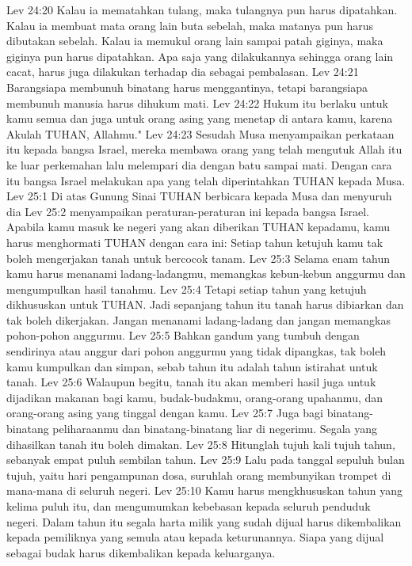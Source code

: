Lev 24:20  Kalau ia mematahkan tulang, maka tulangnya pun harus dipatahkan. Kalau ia membuat mata orang lain buta sebelah, maka matanya pun harus dibutakan sebelah. Kalau ia memukul orang lain sampai patah giginya, maka giginya pun harus dipatahkan. Apa saja yang dilakukannya sehingga orang lain cacat, harus juga dilakukan terhadap dia sebagai pembalasan.
Lev 24:21  Barangsiapa membunuh binatang harus menggantinya, tetapi barangsiapa membunuh manusia harus dihukum mati.
Lev 24:22  Hukum itu berlaku untuk kamu semua dan juga untuk orang asing yang menetap di antara kamu, karena Akulah TUHAN, Allahmu."
Lev 24:23  Sesudah Musa menyampaikan perkataan itu kepada bangsa Israel, mereka membawa orang yang telah mengutuk Allah itu ke luar perkemahan lalu melempari dia dengan batu sampai mati. Dengan cara itu bangsa Israel melakukan apa yang telah diperintahkan TUHAN kepada Musa.
Lev 25:1  Di atas Gunung Sinai TUHAN berbicara kepada Musa dan menyuruh dia
Lev 25:2  menyampaikan peraturan-peraturan ini kepada bangsa Israel. Apabila kamu masuk ke negeri yang akan diberikan TUHAN kepadamu, kamu harus menghormati TUHAN dengan cara ini: Setiap tahun ketujuh kamu tak boleh mengerjakan tanah untuk bercocok tanam.
Lev 25:3  Selama enam tahun kamu harus menanami ladang-ladangmu, memangkas kebun-kebun anggurmu dan mengumpulkan hasil tanahmu.
Lev 25:4  Tetapi setiap tahun yang ketujuh dikhususkan untuk TUHAN. Jadi sepanjang tahun itu tanah harus dibiarkan dan tak boleh dikerjakan. Jangan menanami ladang-ladang dan jangan memangkas pohon-pohon anggurmu.
Lev 25:5  Bahkan gandum yang tumbuh dengan sendirinya atau anggur dari pohon anggurmu yang tidak dipangkas, tak boleh kamu kumpulkan dan simpan, sebab tahun itu adalah tahun istirahat untuk tanah.
Lev 25:6  Walaupun begitu, tanah itu akan memberi hasil juga untuk dijadikan makanan bagi kamu, budak-budakmu, orang-orang upahanmu, dan orang-orang asing yang tinggal dengan kamu.
Lev 25:7  Juga bagi binatang-binatang peliharaanmu dan binatang-binatang liar di negerimu. Segala yang dihasilkan tanah itu boleh dimakan.
Lev 25:8  Hitunglah tujuh kali tujuh tahun, sebanyak empat puluh sembilan tahun.
Lev 25:9  Lalu pada tanggal sepuluh bulan tujuh, yaitu hari pengampunan dosa, suruhlah orang membunyikan trompet di mana-mana di seluruh negeri.
Lev 25:10  Kamu harus mengkhususkan tahun yang kelima puluh itu, dan mengumumkan kebebasan kepada seluruh penduduk negeri. Dalam tahun itu segala harta milik yang sudah dijual harus dikembalikan kepada pemiliknya yang semula atau kepada keturunannya. Siapa yang dijual sebagai budak harus dikembalikan kepada keluarganya.
